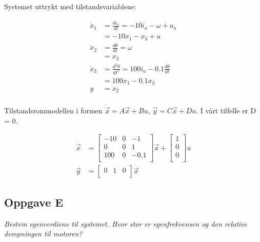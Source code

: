 Systemet uttrykt med tilstandsvariablene:
   
\begin{align*}
	\dot x_1 & = \frac{di_a}{dt} = -10i_a - \omega + u_a                 \\
	         & = -10x_1 - x_3 + u                                        \\
	\dot x_2 & = \frac{d\theta}{dt} = \omega                             \\
	         & = x_3                                                     \\
	\dot x_3 & = \frac{d^2\theta}{dt^2} = 100i_a - 0.1\frac{d\theta}{dt} \\
	         & = 100x_1 - 0.1x_3                                         \\
	y        & = x_2                                                     \\
\end{align*}

Tilstandsrommodellen i formen $ \dot{\vec{x}} = A\vec{x} + Bu $, $ \vec{y} = C\vec{x} + Du $. I vårt tilfelle er D = 0.

\begin{equation}
	\begin{aligned}
		\dot{\vec{x}} &=
		\begin{bmatrix}
		-10 & 0 & -1   \\
		0   & 0 & 1    \\
		100 & 0 & -0.1 \\
		\end{bmatrix}
		\Vec{x}
		+
		\begin{bmatrix}
		1\\
		0\\
		0\\
		\end{bmatrix}
		u\\
		\vec{y} &= 
		\begin{bmatrix}
		0   & 1 & 0    \\
		\end{bmatrix}
		\Vec{x}
		\label{ss-model}
	\end{aligned}
\end{equation}
    
\subsection{Oppgave E}

\emph{Bestem egenverdiene til systemet. Hvor stor er egenfrekvensen og den relative
dempningen til motoren?}

